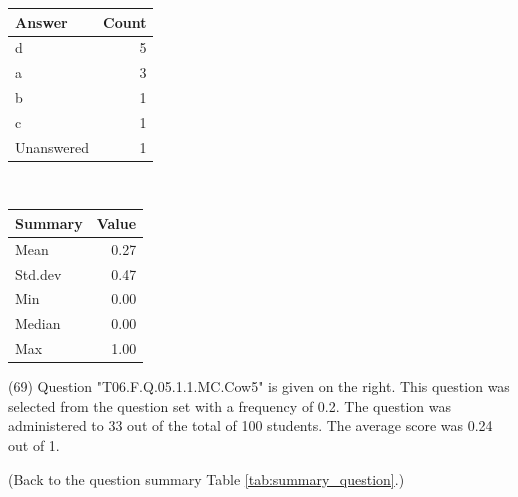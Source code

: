 \documentclass[12pt,nohyper]{tufte-handout}\usepackage[]{graphicx}\usepackage[]{color}
\begin{document}
\begin{center}%
\begin{tabular}{lr}
  \hline
Answer & Count \\ 
  \hline
d &   5 \\ 
  a &   3 \\ 
  b &   1 \\ 
  c &   1 \\ 
  Unanswered &   1 \\ 
   \hline
\end{tabular}
~~~~~~~~%
\begin{tabular}{lr}
  \hline
Summary & Value \\ 
  \hline
Mean & 0.27 \\ 
  Std.dev & 0.47 \\ 
  Min & 0.00 \\ 
  Median & 0.00 \\ 
  Max & 1.00 \\ 
   \hline
\end{tabular}
\end{center}\newpage{} (69) Question "T06.F.Q.05.1.1.MC.Cow5" is given on the right. This question was selected from the question set with a frequency of 0.2. The question was administered to 33 out of the total of 100 students. The average score was 0.24 out of 1.

 (Back to the question summary Table \ref{tab:summary_question}.)
\end{document}
